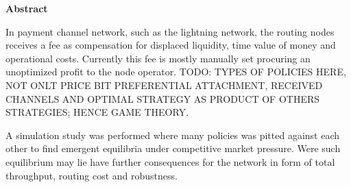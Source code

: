\centering \textbf{Abstract}

\iffalse
    In camera pre-calibration, images of a calibration object are commonly 
    used to determine the internal geometry of a camera.
    The calibration imaging is often optimized to have the calibration object 
    cover as large image area as possible.
    This is likely to yield a larger concentration
    of measured image points near the center of the image sensor.
    In this report, the hypothesis is investigated that this 
    non-uniform image point distribution results in a sub-optimal calibration.
    An area-based re-weighting scheme is suggested to improve the calibration.
    Additionally, the effect of a choice between a 2D and a 3D calibration
    object is investigated.
    
    A simulation study was performed where both a standard and area-weighted
    pre-calibration scheme was used in a parallel and a convergent scene.
    The estimated uncertainty and true errors were computed
    and compared to the first order predictions and results of perfect calibrations.
    The area-based calibration showed no reduction in estimation errors.
    Furthermore, the 3D calibration object did not give a noticeable improvement.
    However, for the standard and area-based calibrations, the true errors
    surpassed the estimated uncertainties by up to
    26 and 58 percent, respectively.
\fi

	In payment channel network, such as the lightning network, the routing
	nodes receives a fee as compensation for displaced liquidity, time value of money and operational
	costs. Currently this fee is mostly manually set procuring an unoptimized profit to
	the node operator. TODO: TYPES OF POLICIES HERE, NOT ONLT PRICE BIT PREFERENTIAL ATTACHMENT, RECEIVED CHANNELS
	AND OPTIMAL STRATEGY AS PRODUCT OF OTHERS STRATEGIES; HENCE GAME THEORY. 
	
	A simulation study was performed where many policies was pitted against 
	each other to find emergent equilibria under competitive market pressure. Were such
	equilibrium may lie have further consequences for the network in form
	of total throughput, routing cost and robustness.
		 
	
	